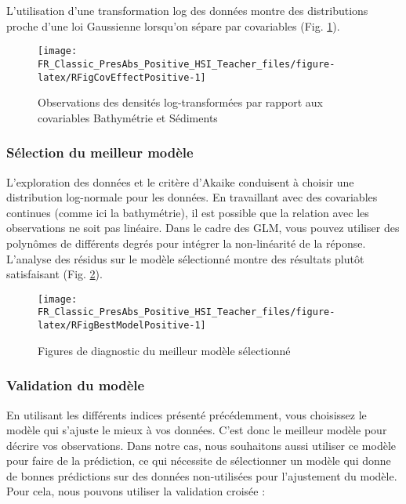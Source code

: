 \documentclass[french,a4paper]{article}
\begin{document}
L'utilisation d'une transformation log des données montre des distributions proche d'une loi Gaussienne lorsqu'on sépare par covariables (Fig. \ref{fig:RFigCovEffectPositive}).



\begin{figure}[!h]

{\centering \texttt{[image: FR\_Classic\_PresAbs\_Positive\_HSI\_Teacher\_files/figure-latex/RFigCovEffectPositive-1]} 

}

\caption{Observations des densités log-transformées par rapport aux covariables Bathymétrie et Sédiments}\label{fig:RFigCovEffectPositive}
\end{figure}

\hypertarget{selection-du-meilleur-modele}{%
\subsubsection{Sélection du meilleur modèle}\label{selection-du-meilleur-modele}}

L'exploration des données et le critère d'Akaike conduisent à choisir une distribution log-normale pour les données. En travaillant avec des covariables continues (comme ici la bathymétrie), il est possible que la relation avec les observations ne soit pas linéaire. Dans le cadre des GLM, vous pouvez utiliser des polynômes de différents degrés pour intégrer la non-linéarité de la réponse.\\
L'analyse des résidus sur le modèle sélectionné montre des résultats plutôt satisfaisant (Fig. \ref{fig:RFigBestModelPositive}).



\begin{figure}[!h]

{\centering \texttt{[image: FR\_Classic\_PresAbs\_Positive\_HSI\_Teacher\_files/figure-latex/RFigBestModelPositive-1]} 

}

\caption{Figures de diagnostic du meilleur modèle sélectionné}\label{fig:RFigBestModelPositive}
\end{figure}

\hypertarget{validation-du-modele}{%
\subsubsection{Validation du modèle}\label{validation-du-modele}}

En utilisant les différents indices présenté précédemment, vous choisissez le modèle qui s'ajuste le mieux à vos données. C'est donc le meilleur modèle pour décrire vos observations. Dans notre cas, nous souhaitons aussi utiliser ce modèle pour faire de la prédiction, ce qui nécessite de sélectionner un modèle qui donne de bonnes prédictions sur des données non-utilisées pour l'ajustement du modèle. Pour cela, nous pouvons utiliser la validation croisée :
\end{document}
